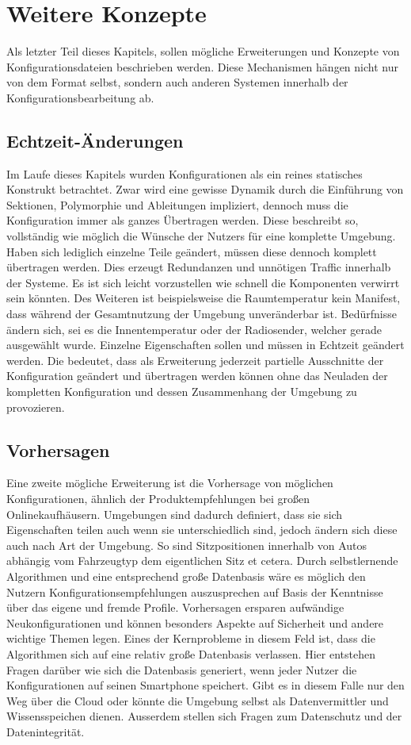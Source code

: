\section{Weitere Konzepte}
Als letzter Teil dieses Kapitels, sollen mögliche Erweiterungen und Konzepte von Konfigurationsdateien beschrieben werden. Diese Mechanismen hängen nicht nur von dem Format selbst, sondern auch anderen Systemen innerhalb der Konfigurationsbearbeitung ab. 

\subsection{Echtzeit-Änderungen}
Im Laufe dieses Kapitels wurden Konfigurationen als ein reines statisches Konstrukt betrachtet. Zwar wird eine gewisse Dynamik durch die Einführung von Sektionen, Polymorphie und Ableitungen impliziert, dennoch muss die Konfiguration immer als ganzes Übertragen werden. Diese beschreibt so, vollständig wie möglich die Wünsche der Nutzers für eine komplette Umgebung. Haben sich lediglich einzelne Teile geändert, müssen diese dennoch komplett übertragen werden. Dies erzeugt Redundanzen und unnötigen Traffic innerhalb der Systeme. Es ist sich leicht vorzustellen wie schnell die Komponenten verwirrt sein könnten. Des Weiteren ist beispielsweise die Raumtemperatur kein Manifest, dass während der Gesamtnutzung der Umgebung unveränderbar ist. Bedürfnisse ändern sich, sei es die Innentemperatur oder der Radiosender, welcher gerade ausgewählt wurde. Einzelne Eigenschaften sollen und müssen in Echtzeit geändert werden. Die bedeutet, dass als Erweiterung jederzeit partielle Ausschnitte der Konfiguration geändert und übertragen werden können ohne das Neuladen der kompletten Konfiguration und dessen Zusammenhang der Umgebung zu provozieren.

\subsection{Vorhersagen}
Eine zweite mögliche Erweiterung ist die Vorhersage von möglichen Konfigurationen, ähnlich der Produktempfehlungen bei großen Onlinekaufhäusern. Umgebungen sind dadurch definiert, dass sie sich Eigenschaften teilen auch wenn sie unterschiedlich sind, jedoch ändern sich diese auch nach Art der Umgebung. So sind Sitzpositionen innerhalb von Autos abhängig vom Fahrzeugtyp dem eigentlichen Sitz et cetera. Durch selbstlernende Algorithmen und eine entsprechend große Datenbasis wäre es möglich den Nutzern Konfigurationsempfehlungen auszusprechen auf Basis der Kenntnisse über das eigene und fremde Profile. Vorhersagen ersparen aufwändige Neukonfigurationen und können besonders Aspekte auf Sicherheit und andere wichtige Themen legen. Eines der Kernprobleme in diesem Feld ist, dass die Algorithmen sich auf eine relativ große Datenbasis verlassen. Hier entstehen Fragen darüber wie sich die Datenbasis generiert, wenn jeder Nutzer die Konfigurationen auf seinen Smartphone speichert. Gibt es in diesem Falle nur den Weg über die Cloud oder könnte die Umgebung selbst als Datenvermittler und Wissensspeichen dienen. Ausserdem stellen sich Fragen zum Datenschutz und der Datenintegrität. 

